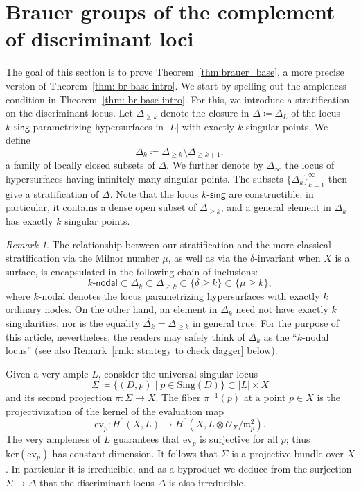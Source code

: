 \documentclass[11pt]{amsart}
\theoremstyle{plain}
\theoremstyle{definition}
\theoremstyle{remark}
\newtheorem{rmk}[thm]{Remark}
\begin{document}
\section{Brauer groups of the complement of discriminant loci}\label{sec: brauer group}

The goal of this section is to prove Theorem~\ref{thm:brauer_base}, a more precise version of Theorem~\ref{thm: br base intro}. We start by spelling out the ampleness condition in Theorem~\ref{thm: br base intro}. For this, we introduce a stratification on the discriminant locus. Let $\Delta_{\geq k}$ denote the closure in $\Delta \coloneq \Delta_L$ of the locus $k\textsf{-sing}$ parametrizing hypersurfaces in $|L|$ with {exactly} $k$ singular points. We define 
\[
\Delta_k \coloneq \Delta_{\geq k} \setminus \Delta_{\geq k+1},
\]
a family of locally closed subsets of $\Delta$. We further denote by $\Delta_\infty$ the locus of hypersurfaces having infinitely many singular points. The subsets $\{\Delta_k\}_{k=1}^\infty$ then give a stratification of $\Delta$. Note that the locus $k\textsf{-sing}$ are constructible; in particular, it contains a dense open subset of $\Delta_{\geq k}$, and a general element in $\Delta_k$ has exactly $k$ singular points.

\begin{rmk}\label{rmk: mu and delta}
    The relationship between our stratification and the more classical stratification via the Milnor number $\mu$, as well as via the $\delta$-invariant when $X$ is a surface, is encapsulated in the following chain of inclusions:
    \begin{equation}\label{eq: chain of inclusions}
    k \textsf{-nodal} \subset \Delta_k \subset \Delta_{\geq k} \subset \{\delta \geq k\} \subset \{\mu \geq k\},
    \end{equation}
where $k$\textsf{-nodal} denotes the locus parametrizing hypersurfaces with exactly $k$ ordinary nodes. On the other hand, an element in $\Delta_k$ need not have exactly $k$ singularities, nor is the equality $\overline{\Delta_k} = \Delta_{\geq k}$ in general true. For the purpose of this article, nevertheless, the readers may safely think of $\Delta_k$ as the ``$k$-nodal locus'' (see also Remark~\ref{rmk: strategy to check dagger} below).
\end{rmk}

Given a very ample $L$, consider the universal singular locus
     \[
     \Sigma\coloneq \{(D,p)\mid p\in \mathrm{Sing}(D)\} \subset |L|\times X
     \]
     and its second projection $\pi: \Sigma \to X$. The fiber $\pi^{-1}(p)$ at a point $p\in X$ is the projectivization of the kernel of the evaluation map
     \[
     \mathrm{ev}_p: H^0(X, L) \longrightarrow H^0(X, L\otimes \mathcal{O}_X/\mathfrak{m}_p^2).
     \]
     The very ampleness of $L$ guarantees that $\mathrm{ev}_p$ is surjective for all $p$; thus $\mathrm{ker}(\mathrm{ev}_p)$ has constant dimension. It follows that $\Sigma$ is a projective bundle over $X$. In particular it is irreducible, and as a byproduct we deduce from the surjection $\Sigma \to \Delta$ that the discriminant locus $\Delta$ is also irreducible.
\end{document}
